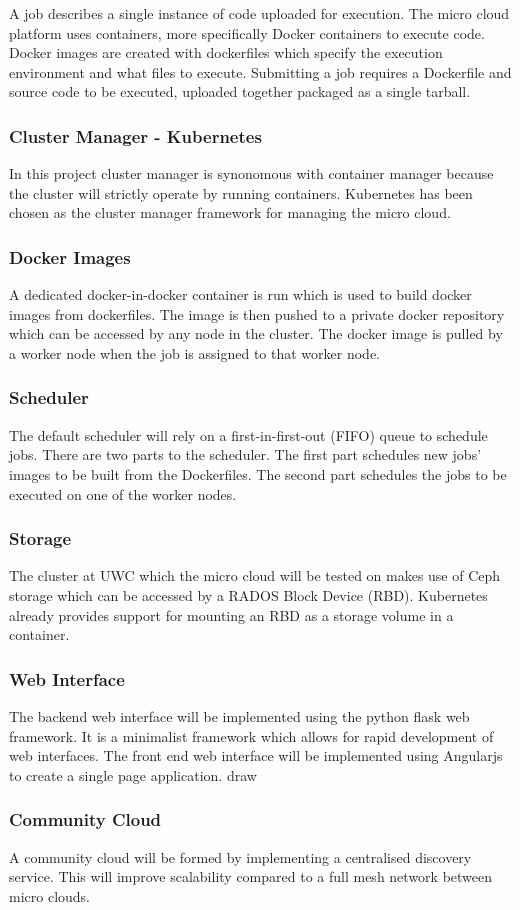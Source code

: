 \documentclass{sig-alternate-05-2015}
\begin{document}
A job describes a single instance of code uploaded for execution. 
The micro cloud platform uses containers, more specifically Docker containers to execute code. Docker images are created with dockerfiles which specify the execution environment and what files to execute. Submitting a job requires a Dockerfile and source code to be executed, uploaded together packaged as a single tarball.  

\subsubsection{Cluster Manager - Kubernetes}
In this project cluster manager is synonomous with container manager because the cluster will strictly operate by running containers. Kubernetes has been chosen as the cluster manager framework for managing the micro cloud.

\subsubsection{Docker Images}
A dedicated docker-in-docker container is run which is used to build docker images from dockerfiles. The image is then pushed to a private docker repository which can be accessed by any node in the cluster. The docker image is pulled by a worker node when the job is assigned to that worker node.

\subsubsection{Scheduler}
The default scheduler will rely on a first-in-first-out (FIFO) queue to schedule jobs. There are two parts to the scheduler. The first part schedules new jobs' images to be built from the Dockerfiles. The second part schedules the jobs to be executed on one of the worker nodes.

\subsubsection{Storage}
The cluster at UWC which the micro cloud will be tested on makes use of Ceph storage which can be accessed by a RADOS Block Device (RBD). Kubernetes already provides support for mounting an RBD as a storage volume in a container.

\subsubsection{Web Interface}
The backend web interface will be implemented using the python flask web framework. It is a minimalist framework which allows for rapid development of web interfaces. 
The front end web interface will be implemented using Angularjs to create a single page application. 
draw
\subsubsection{Community Cloud}
A community cloud will be formed by implementing a centralised discovery service. This will improve scalability compared to a full mesh network between micro clouds.




 
\end{document}
